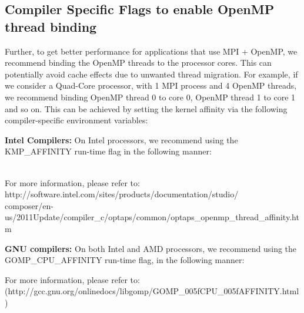 

\subsection{Compiler Specific Flags to enable OpenMP thread binding}
\label{sec:advanced_omp_thread_binding}


Further, to get better performance for applications that use MPI + OpenMP, we recommend binding the
OpenMP threads to the processor cores. This can potentially avoid cache effects due to
unwanted thread migration. For example, if we consider a Quad-Core processor,
with 1 MPI process and 4 OpenMP threads, we recommend binding
OpenMP thread 0 to core 0, OpenMP thread 1 to core 1 and so on.
This can be achieved by setting the kernel affinity via
the following compiler-specific environment variables:

\textbf{Intel Compilers:}
On Intel processors, we recommend using the KMP\_AFFINITY run-time flag in the
following manner:

\\

For more information, please refer to: \\
http://software.intel.com/sites/products/documentation/studio/\\composer/en-us/2011Update/compiler\_c/optaps/common/optaps\_openmp\_thread\_affinity.htm

\textbf{GNU compilers:}
On both Intel and AMD processors, we recommend using the \\ 
GOMP\_CPU\_AFFINITY run-time flag, in the following manner:


For more information, please refer to:\\
(http://gcc.gnu.org/onlinedocs/libgomp/GOMP\_005fCPU\_005fAFFINITY.html)


